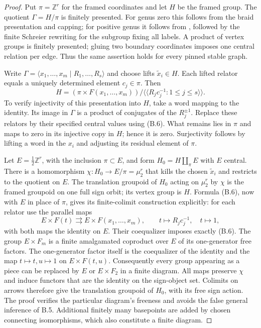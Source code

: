 \begin{proof}
Put $\pi=\mathbb Z^r$ for the framed coordinates and let $H$ be the
framed group.  The quotient $\Gamma=H/\pi$ is finitely presented.
For genus zero this follows from the braid presentation and capping;
for positive genus it follows from
\citet[Theorems 3.1 and 3.2]{B_LabruereParis}, followed by the finite
Schreier rewriting for the subgroup fixing all labels.  A product
of vertex groups is finitely presented; gluing two boundary
coordinates imposes one central relation per edge.  Thus the same
assertion holds for every pinned stable graph.

Write $\Gamma=\langle x_1,\ldots,x_m\mid R_1,\ldots,R_s\rangle$
and choose lifts $\widetilde x_i\in H$.  Each lifted relator equals
a uniquely determined element $c_j\in\pi$.  Then
\[
 H=\left(\pi\times F(x_1,\ldots,x_m)\right)
       /\langle\!\langle R_jc_j^{-1}:1\leq j\leq s\rangle\!\rangle.
 \tag{B.6}
\]
To verify injectivity of this presentation into $H$, take a word
mapping to the identity.  Its image in $\Gamma$ is a product of
conjugates of the $R_j^{\pm1}$.  Replace these relators by their
specified central values using (B.6).  What remains lies in $\pi$
and maps to zero in its injective copy in $H$; hence it is zero.
Surjectivity follows by lifting a word in the $x_i$ and adjusting
its residual element of $\pi$.

Let $E=\tfrac12\mathbb Z^r$, with the inclusion
$\pi\subset E$, and form $H_0=H\amalg_{\pi}E$ with $E$ central.
There is a homomorphism $\chi:H_0\to E/\pi=\mu_2^r$ that kills the
chosen $\widetilde x_i$ and restricts to the quotient on $E$.
The translation groupoid of $H_0$ acting on $\mu_2^r$ by $\chi$ is
the framed groupoid on one full sign orbit; its vertex group is
$H$.  Formula (B.6), now with $E$ in place of $\pi$, gives its
finite-colimit construction explicitly: for each relator use the
parallel maps
\[
 E\times F(t)\rightrightarrows E\times F(x_1,\ldots,x_m),
 \qquad t\mapsto R_jc_j^{-1},\quad t\mapsto1,
 \tag{B.7}
\]
with both maps the identity on $E$.  Their coequalizer imposes
exactly (B.6).  The group $E\times F_m$ is a finite amalgamated
coproduct over $E$ of its one-generator free factors.  The
one-generator factor itself is the coequalizer of the identity
and the map $t\mapsto t,u\mapsto1$ on $E\times F(t,u)$.
Consequently every group appearing as a piece can be replaced by
$E$ or $E\times F_2$ in a finite diagram.  All maps preserve
$\chi$ and induce functors that are the identity on the sign-object
set.  Colimits on arrows therefore give the translation groupoid
of $H_0$, with its free sign action.  The proof verifies the
particular diagram's freeness and avoids the false general
inference of B.5.  Additional finitely many basepoints are added
by chosen connecting isomorphisms, which also constitute a finite
diagram.
\end{proof}

